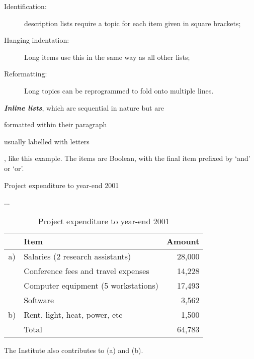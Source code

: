\begin{description}
\item[Identification:] description lists require a topic
for each item given in square brackets;
\item[Hanging indentation:] Long items use this in the
same way as all other lists;
\item[Reformatting:] Long topics can be reprogrammed to
fold onto multiple lines.
\end{description}

\textbf{\itshape Inline lists}, which are sequential in
nature but are \begin{inparaenum}
\item formatted within their paragraph
\item usually labelled with letters\end{inparaenum},
like this example. The items are Boolean, with the final
item prefixed by ‘and’ or ‘or’.

\newpage

\begin{table}
\caption{Project expenditure to year-end 2001}
\label{ye2001exp}
...
\end{table}

\begin{table}
\caption{Project expenditure to year-end 2001}
\label{ye2001exp}
\begin{center}
\begin{tabular}{clr}
&Item&Amount\\
\hline
a)&Salaries (2 research assistants)&28,000\\
&Conference fees and travel expenses&14,228\\
&Computer equipment (5 workstations)&17,493\\
&Software&3,562\\
b)&Rent, light, heat, power, etc&1,500\\\cline{3-3}
&Total&64,783
\end{tabular}
\par\medskip\footnotesize
The Institute also contributes to (a) and (b).
\end{center}
\end{table}




